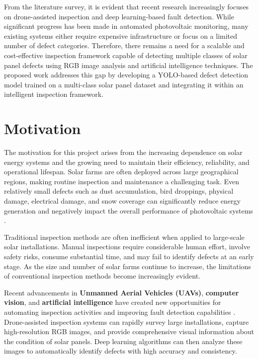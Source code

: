 From the literature survey, it is evident that recent research increasingly focuses on drone-assisted inspection and deep learning-based fault detection. While significant progress has been made in automated photovoltaic monitoring, many existing systems either require expensive infrastructure or focus on a limited number of defect categories. Therefore, there remains a need for a scalable and cost-effective inspection framework capable of detecting multiple classes of solar panel defects using RGB image analysis and artificial intelligence techniques. The proposed work addresses this gap by developing a YOLO-based defect detection model trained on a multi-class solar panel dataset and integrating it within an intelligent inspection framework.

\section{Motivation}

The motivation for this project arises from the increasing dependence on solar energy systems and the growing need to maintain their efficiency, reliability, and operational lifespan. Solar farms are often deployed across large geographical regions, making routine inspection and maintenance a challenging task. Even relatively small defects such as dust accumulation, bird droppings, physical damage, electrical damage, and snow coverage can significantly reduce energy generation and negatively impact the overall performance of photovoltaic systems \cite{ref2,ref3}.

Traditional inspection methods are often inefficient when applied to large-scale solar installations. Manual inspections require considerable human effort, involve safety risks, consume substantial time, and may fail to identify defects at an early stage. As the size and number of solar farms continue to increase, the limitations of conventional inspection methods become increasingly evident.

Recent advancements in \textbf{Unmanned Aerial Vehicles (UAVs)}, \textbf{computer vision}, and \textbf{artificial intelligence} have created new opportunities for automating inspection activities and improving fault detection capabilities \cite{ref6,ref7,ref28}. Drone-assisted inspection systems can rapidly survey large installations, capture high-resolution RGB images, and provide comprehensive visual information about the condition of solar panels. Deep learning algorithms can then analyze these images to automatically identify defects with high accuracy and consistency.

